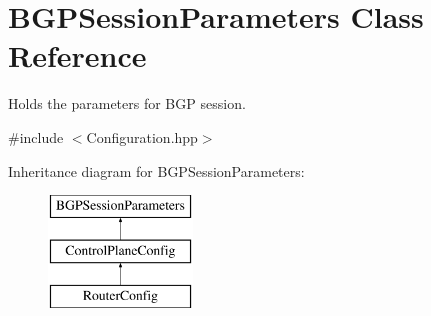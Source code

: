 \hypertarget{classBGPSessionParameters}{\section{B\-G\-P\-Session\-Parameters Class Reference}
\label{classBGPSessionParameters}
}


Holds the parameters for B\-G\-P session.  




{\ttfamily \#include $<$Configuration.\-hpp$>$}

Inheritance diagram for B\-G\-P\-Session\-Parameters\-:\begin{figure}[H]
\begin{center}
\leavevmode
\includegraphics[height=3.000000cm]{classBGPSessionParameters}
\end{center}
\end{figure}
